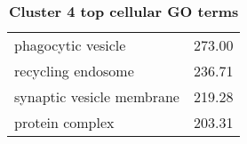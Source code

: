 \begin{table}[h]
\begin{center}
\begin{tabular}{@{}lr@{}}
phagocytic vesicle                                           & 273.00                      \\
recycling endosome                                           & 236.71                      \\
synaptic vesicle membrane                                    & 219.28                      \\
protein complex                                              & 203.31                      \\ \bottomrule
\end{tabular}
\end{center}

\caption[Cluster 4 top cellular GO terms]{\sf \textbf{Cluster 4 top cellular GO terms}}
\label{tab:cls4-cellular}
\end{table}